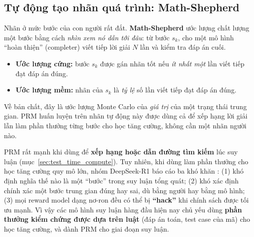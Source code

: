 \subsection{Tự động tạo nhãn quá trình: Math-Shepherd}
\label{ssec:math_shepherd}
Nhãn ở mức bước của con người rất đắt. \textbf{Math-Shepherd} \cite{wang2024mathshepherd} ước lượng chất lượng một bước bằng cách \emph{nhìn xem nó dẫn tới đâu}: từ bước $s_k$, cho một mô hình “hoàn thiện” (completer) viết tiếp lời giải $N$ lần và kiểm tra đáp án cuối.
\begin{itemize}
	\item \textbf{Ước lượng cứng:} bước $s_k$ được gán nhãn tốt nếu \emph{ít nhất một} lần viết tiếp đạt đáp án đúng.
	\item \textbf{Ước lượng mềm:} nhãn của $s_k$ là \emph{tỷ lệ} số lần viết tiếp đạt đáp án đúng.
\end{itemize}
Về bản chất, đây là ước lượng Monte Carlo của \emph{giá trị} của một trạng thái trung gian. PRM huấn luyện trên nhãn tự động này được dùng cả để xếp hạng lời giải lẫn làm phần thưởng từng bước cho học tăng cường, không cần một nhãn người nào.

\begin{tcolorbox}[title={ORM hay PRM? Góc nhìn năm 2026}, colback=red!5!white, colframe=red!75!black, fonttitle=\bfseries]
PRM rất mạnh khi dùng để \textbf{xếp hạng hoặc dẫn đường tìm kiếm} lúc suy luận (mục~\ref{sec:test_time_compute}). Tuy nhiên, khi dùng làm phần thưởng cho học tăng cường quy mô lớn, nhóm DeepSeek-R1 báo cáo ba khó khăn \cite{deepseekai2025r1}: (1) khó định nghĩa thế nào là một “bước” trong suy luận tổng quát; (2) khó xác định chính xác một bước trung gian đúng hay sai, dù bằng người hay bằng mô hình; (3) mọi reward model dạng nơ-ron đều có thể bị \textbf{“hack”} khi chính sách được tối ưu mạnh. Vì vậy các mô hình suy luận hàng đầu hiện nay chủ yếu dùng \textbf{phần thưởng kiểm chứng được dựa trên luật} (đáp án toán, test case của mã) cho học tăng cường, và dành PRM cho giai đoạn suy luận.
\end{tcolorbox}
